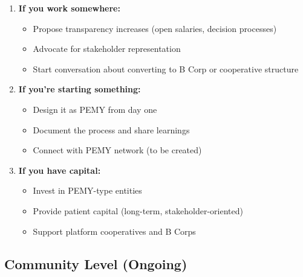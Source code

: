 \documentclass[11pt,a4paper]{article}
\theoremstyle{definition}
\theoremstyle{remark}
\begin{document}
\begin{enumerate}
    \item \textbf{If you work somewhere:}
    \begin{itemize}
        \item Propose transparency increases (open salaries, decision processes)
        \item Advocate for stakeholder representation
        \item Start conversation about converting to B Corp or cooperative structure
    \end{itemize}
    
    \item \textbf{If you're starting something:}
    \begin{itemize}
        \item Design it as PEMY from day one
        \item Document the process and share learnings
        \item Connect with PEMY network (to be created)
    \end{itemize}
    
    \item \textbf{If you have capital:}
    \begin{itemize}
        \item Invest in PEMY-type entities
        \item Provide patient capital (long-term, stakeholder-oriented)
        \item Support platform cooperatives and B Corps
    \end{itemize}
\end{enumerate}

\subsection{Community Level (Ongoing)}
\end{document}
